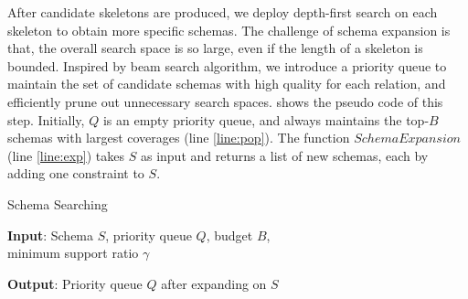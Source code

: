 After candidate skeletons are produced, we deploy depth-first search on
each skeleton to obtain more specific schemas.
The challenge of schema expansion is that, the overall search space is so
large, even if the length of a skeleton is bounded.
Inspired by beam search algorithm\cite{ney1992improvements}, 
we introduce a priority queue to maintain the set of candidate schemas
with high quality for each relation, and efficiently prune out
unnecessary search spaces.
 shows the pseudo code of this step.
Initially, $Q$ is an empty priority queue, and always maintains 
the top-$B$ schemas with largest coverages (line \ref{line:pop}).
The function $SchemaExpansion$ (line \ref{line:exp}) takes $S$ as input and returns a list of
new schemas, each by adding one constraint to $S$.

\begin{algorithm}
\small
\caption{Schema Searching}
\label{alg:dfs}
\textbf{Input}: Schema $S$, priority queue $Q$, budget $B$,\\
minimum support ratio $\gamma$

\textbf{Output}: Priority queue $Q$ after expanding on $S$
\begin{algorithmic}[1]
	\EndIf
			 \label{line:pop}%
		\EndWhile
		 \label{line:exp}
		\EndFor
	\EndIf
\EndProcedure
\end{algorithmic}
\end{algorithm}


